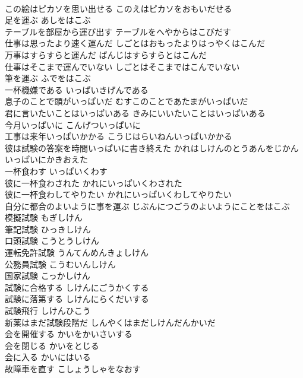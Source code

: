 \documentclass[8pt]{extreport}
\begin{document}
\begin{CJK}{UTF8}{min}
\\	この絵はピカソを思い出せる	このえはピカソをおもいだせる	
\\	足を運ぶ	あしをはこぶ	
\\	テーブルを部屋から運び出す	テーブルをへやからはこびだす	
\\	仕事は思ったより速く運んだ	しごとはおもったよりはっやくはこんだ	
\\	万事はすらすらと運んだ	ばんじはすらすらとはこんだ	
\\	仕事はそこまで運んでいない	しごとはそこまではこんでいない	
\\	筆を運ぶ	ふでをはこぶ	
\\	一杯機嫌である	いっぱいきげんである	
\\	息子のことで頭がいっぱいだ	むすこのことであたまがいっぱいだ	
\\	君に言いたいことはいっぱいある	きみにいいたいことはいっぱいある	
\\	今月いっぱいに	こんげついっぱいに	
\\	工事は来年いっぱいかかる	こうじはらいねんいっぱいかかる	
\\	彼は試験の答案を時間いっぱいに書き終えた	かれはしけんのとうあんをじかんいっぱいにかきおえた	
\\	一杯食わす	いっぱいくわす	
\\	彼に一杯食わされた	かれにいっぱいくわされた	
\\	彼に一杯食わしてやりたい	かれにいっぱいくわしてやりたい	
\\	自分に都合のよいように事を運ぶ	じぶんにつごうのよいようにことをはこぶ	
\\	模擬試験	もぎしけん	
\\	筆記試験	ひっきしけん	
\\	口頭試験	こうとうしけん	
\\	運転免許試験	うんてんめんきょしけん	
\\	公務員試験	こうむいんしけん	
\\	国家試験	こっかしけん	
\\	試験に合格する	しけんにごうかくする	
\\	試験に落第する	しけんにらくだいする	
\\	試験飛行	しけんひこう	
\\	新薬はまだ試験段階だ	しんやくはまだしけんだんかいだ	
\\	会を開催する	かいをかいさいする	
\\	会を閉じる	かいをとじる	
\\	会に入る	かいにはいる	
\\	故障車を直す	こしょうしゃをなおす	

\end{CJK}
\end{document}
